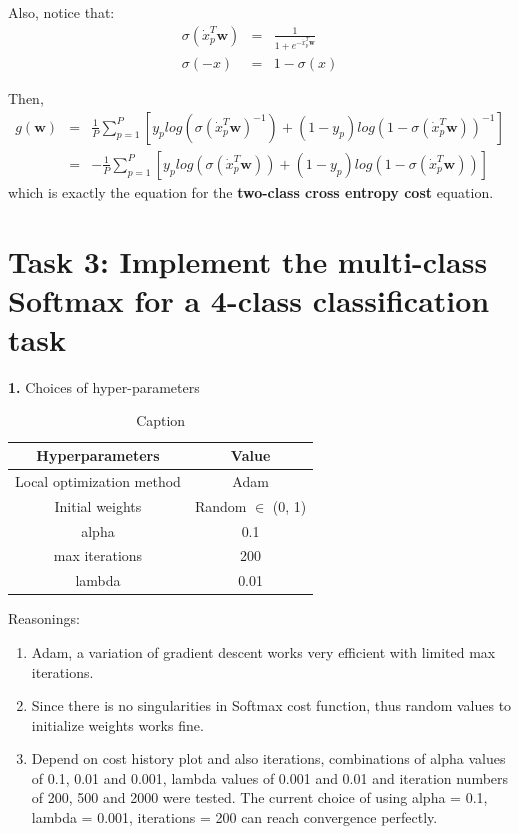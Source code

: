 Also, notice that:
\begin{eqnarray}
    \sigma(\dot{x}_p^T \textbf{w}) &=& \frac{1}{1 + e^{-\dot{x}_p^T \textbf{w}}} \\
    \sigma(-x) &=& 1- \sigma(x)
\end{eqnarray}

Then,
\begin{eqnarray}
    g(\textbf{w}) &=& \frac{1}{P} \sum_{p=1}^{P} [ y_p log ( \sigma(\dot{x}_p^T \textbf{w})^{-1}) + (1 - y_p) log ( 1- \sigma(\dot{x}_p^T \textbf{w}) )^{-1}] \\
    &=& - \frac{1}{P} \sum_{p=1}^{P} [ y_p log ( \sigma(\dot{x}_p^T \textbf{w})) + (1 - y_p) log ( 1- \sigma(\dot{x}_p^T \textbf{w}) )]
\end{eqnarray}
which is exactly the equation for the \textbf{two-class cross entropy cost} equation.

\newpage
\section*{\textbf{Task 3: Implement the multi-class Softmax for a 4-class classification task}}

\textbf{1.} Choices of h{yp}er-parameters
\begin{table}[H]
    \centering
    \begin{tabular}{|c|c|}
    \hline
         H{yp}erparameters &  Value  \\
         \hline
         Local optimization method & Adam \\
         Initial weights & Random $\in$ (0, 1)   \\
         alpha & 0.1   \\
         max iterations & 200  \\
         lambda & 0.01 \\
    \hline
    \end{tabular}
    \caption{Caption}
    \label{tab:my_label}
\end{table}

Reasonings:
\begin{enumerate}
    \item Adam, a variation of gradient descent works very efficient with limited max iterations.
    \item Since there is no singularities in Softmax cost function, thus random values to initialize weights works fine.
    \item Depend on cost history plot and also iterations, combinations of alpha values of 0.1, 0.01 and 0.001, lambda values of 0.001 and 0.01 and iteration numbers of 200, 500 and 2000 were tested. The current choice of using alpha = 0.1, lambda = 0.001, iterations = 200 can reach convergence perfectly.
\end{enumerate}

